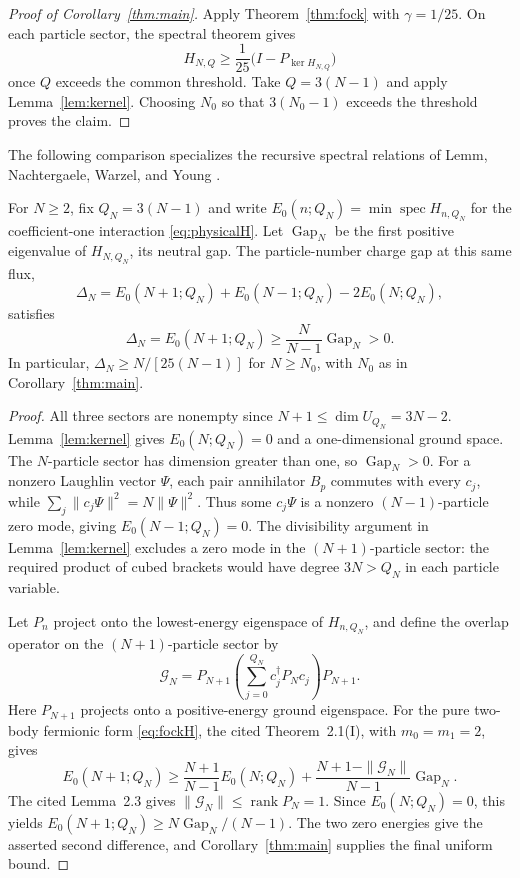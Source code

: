 \begin{proof}[Proof of Corollary~\ref{thm:main}]
Apply Theorem~\ref{thm:fock} with $\gamma=1/25$. On each particle sector,
the spectral theorem gives
\[
 H_{N,Q}\ge\frac1{25}\bigl(I-P_{\ker H_{N,Q}}\bigr)
\]
once $Q$ exceeds the common threshold. Take $Q=3(N-1)$ and apply
Lemma~\ref{lem:kernel}. Choosing $N_0$ so that $3(N_0-1)$ exceeds the
threshold proves the claim.
\end{proof}

The following comparison specializes the recursive spectral relations of
Lemm, Nachtergaele, Warzel, and Young
\cite[arXiv v1, Theorem~2.1(I), Lemma~2.3, and (2.10)]{LemmNachtergaeleWarzelYoung2026Recursive}.

\begin{corollary}\label{cor:charge-neutral}
For \(N\ge2\), fix \(Q_N=3(N-1)\) and write
\(E_0(n;Q_N)=\min\operatorname{spec}H_{n,Q_N}\) for the coefficient-one
interaction \eqref{eq:physicalH}.  Let \(\operatorname{Gap}_N\) be the
first positive eigenvalue of \(H_{N,Q_N}\), its neutral gap.
The particle-number charge gap at this same flux,
\[
 \Delta_N=E_0(N+1;Q_N)+E_0(N-1;Q_N)-2E_0(N;Q_N),
\]
satisfies
\[
 \Delta_N=E_0(N+1;Q_N)
       \ge\frac{N}{N-1}\operatorname{Gap}_N>0.
\]
In particular, \(\Delta_N\ge N/[25(N-1)]\) for \(N\ge N_0\), with
\(N_0\) as in Corollary~\ref{thm:main}.
\end{corollary}

\begin{proof}
All three sectors are nonempty since \(N+1\le\dim U_{Q_N}=3N-2\).
Lemma~\ref{lem:kernel} gives \(E_0(N;Q_N)=0\) and a one-dimensional
ground space.  The \(N\)-particle sector has dimension greater than one,
so \(\operatorname{Gap}_N>0\).
For a nonzero Laughlin vector \(\Psi\), each pair annihilator \(B_p\)
commutes with every \(c_j\), while
\(\sum_j\|c_j\Psi\|^2=N\|\Psi\|^2\).  Thus some \(c_j\Psi\) is a nonzero
\((N-1)\)-particle zero mode, giving \(E_0(N-1;Q_N)=0\).
The divisibility argument in Lemma~\ref{lem:kernel} excludes a zero mode
in the \((N+1)\)-particle sector: the required product of cubed brackets
would have degree \(3N>Q_N\) in each particle variable.

Let \(P_n\) project onto the lowest-energy eigenspace of \(H_{n,Q_N}\),
and define the overlap operator on the \((N+1)\)-particle sector by
\[
 \mathcal G_N=P_{N+1}\left(\sum_{j=0}^{Q_N}c_j^\dagger P_Nc_j\right)P_{N+1}.
\]
Here \(P_{N+1}\) projects onto a positive-energy ground eigenspace.
For the pure two-body fermionic form \eqref{eq:fockH}, the cited
Theorem~2.1(I), with \(m_0=m_1=2\), gives
\[
 E_0(N+1;Q_N)\ge\frac{N+1}{N-1}E_0(N;Q_N)
   +\frac{N+1-\|\mathcal G_N\|}{N-1}\operatorname{Gap}_N.
\]
The cited Lemma~2.3 gives \(\|\mathcal G_N\|\le\operatorname{rank}P_N=1\).
Since \(E_0(N;Q_N)=0\), this yields
\(E_0(N+1;Q_N)\ge N\operatorname{Gap}_N/(N-1)\).
The two zero energies give the asserted second difference, and
Corollary~\ref{thm:main} supplies the final uniform bound.
\end{proof}
